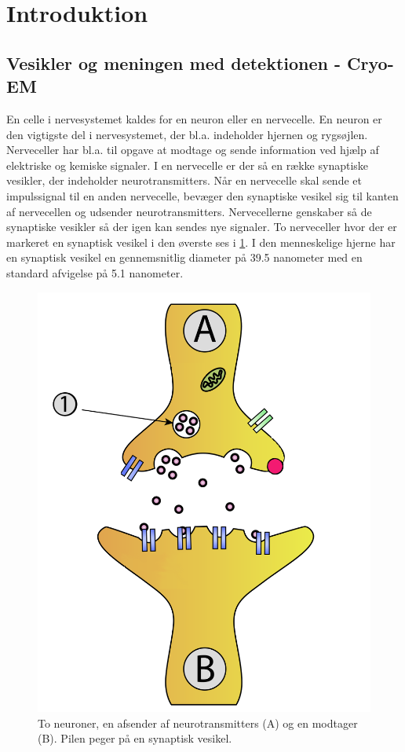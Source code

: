 \section{Introduktion} %
\subsection{Vesikler og meningen med detektionen - Cryo-EM} %
En celle i nervesystemet kaldes for en neuron eller en nervecelle. En neuron er den vigtigste del i nervesystemet, der bl.a. indeholder hjernen og rygsøjlen. Nerveceller har bl.a. til opgave at modtage og sende information ved hjælp af elektriske og kemiske signaler. I en nervecelle er der så en række synaptiske vesikler, der indeholder neurotransmitters. Når en nervecelle skal sende et impulssignal til en anden nervecelle, bevæger den synaptiske vesikel sig til kanten af nervecellen og udsender neurotransmitters. Nervecellerne genskaber så de synaptiske vesikler så der igen kan sendes nye signaler. To nerveceller hvor der er markeret en synaptisk vesikel i den øverste ses i \ref{fig:syntrans}. I den menneskelige hjerne har en synaptisk vesikel en gennemsnitlig diameter på 39.5 nanometer med en standard afvigelse på 5.1 nanometer.

\begin{figure}[H]
	\centering
	\includegraphics[scale=0.3]{files/intro/img/synTransmitter.png}
	\caption{To neuroner, en afsender af neurotransmitters (A) og en modtager (B). Pilen peger på en synaptisk vesikel.\label{fig:syntrans}}
\end{figure} 

